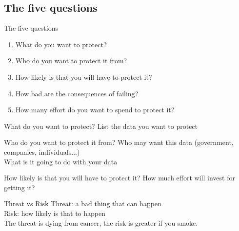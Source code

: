 \documentclass[11pt]{beamer}
\begin{document}
\subsection{The five questions}
\begin{frame}{The five questions}
\begin{enumerate}
\item What do you want to protect?
\item Who do you want to protect it from?
\item How  likely is that you will have to protect it?
\item How bad are the consequences of failing?
\item How many effort do you want to spend to protect it?
\end{enumerate}
\end{frame}
\begin{frame}{What do you want to protect?}
List the  data  you want to  protect
\end{frame}
\begin{frame}{Who do you want to protect it from?}
Who may want this data (government, companies, individuals...)\\
What is it going to do with your data
\end{frame}
\begin{frame}{How likely is that you will have to protect it?}
How much effort will invest for getting it?
\end{frame}
\begin{frame}{Threat vs Risk}
Threat: a bad thing that can happen\\
Risk: how likely is that to happen\\
The threat is dying from cancer, the risk is greater if you smoke.
\end{frame}
\end{document}
